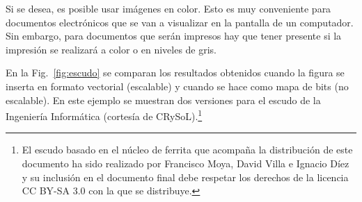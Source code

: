 \documentclass[ 		%
	11pt,				%
	a4paper,			%
	twoside,			%
	openright,			%
	final       		%
]{book}
\begin{document}
Si se desea, es posible usar imágenes en color. Esto es muy conveniente para documentos electrónicos que se van a visualizar en la pantalla de un computador. Sin embargo, para documentos que serán impresos hay que tener presente si la impresión se realizará a color o en niveles de gris. 

En la Fig.~\ref{fig:escudo} se comparan los resultados obtenidos cuando la figura se inserta en formato vectorial (escalable) y cuando se hace como mapa de bits (no escalable). En este ejemplo se muestran dos versiones para el escudo de la Ingeniería Informática (cortesía de CRySoL).\footnote{El escudo basado en el núcleo de ferrita que acompaña la distribución de este documento ha sido realizado por Francisco Moya, David Villa e Ignacio Díez y su inclusión en el documento final debe respetar los derechos de la licencia CC BY-SA 3.0 con la que se distribuye.}
\end{document}
